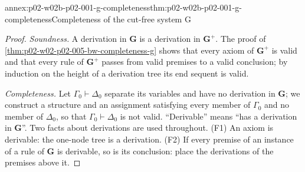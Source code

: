 \begin{annexitem}{annex:p02-w02b-p02-001-g-completeness}{thm:p02-w02b-p02-001-g-completeness}{Completeness of the cut-free system G}
\begin{proof}
\emph{Soundness.}  A derivation in \(\mathbf G\) is a derivation in
\(\mathbf G^{+}\).  The proof of \cref{thm:p02-w02-p02-005-bw-completeness-g}
shows that every axiom of \(\mathbf G^{+}\) is valid and that every rule of
\(\mathbf G^{+}\) passes from valid premises to a valid conclusion; by
induction on the height of a derivation tree its end sequent is valid.

\emph{Completeness.}  Let \(\Gamma_0\vdash\Delta_0\) separate its variables
and have no derivation in \(\mathbf G\); we construct a structure and an
assignment satisfying every member of \(\Gamma_0\) and no member of
\(\Delta_0\), so that \(\Gamma_0\vdash\Delta_0\) is not valid.  ``Derivable''
means ``has a derivation in \(\mathbf G\)''.  Two facts about derivations
are used throughout.  (F1) An axiom is derivable: the one-node tree is a
derivation.  (F2) If every premise of an instance of a rule of \(\mathbf G\)
is derivable, so is its conclusion: place the derivations of the premises
above it.


\end{proof}
\end{annexitem}
